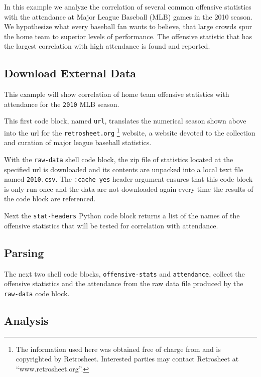 \documentclass[11pt]{article}
\begin{document}
In this example we analyze the correlation of several common offensive
statistics with the attendance at Major League Baseball (MLB) games in
the 2010 season.  We hypothesize what every baseball fan wants to
believe, that large crowds spur the home team to superior levels of
performance.  The offensive statistic that has the largest correlation
with high attendance is found and reported.
\subsection{Download External Data}
\label{sec-4_1}

This example will show correlation of home team offensive statistics
with attendance for the  \texttt{2010} MLB season.



This first code block, named \texttt{url}, translates the numerical season
shown above into the url for the \texttt{retrosheet.org} \footnote{The information used here was obtained free of charge from and
       is copyrighted by Retrosheet.  Interested parties may contact
       Retrosheet at ``www.retrosheet.org''. } website, a
website devoted to the collection and curation of major league
baseball statistics.



With the \texttt{raw-data} shell code block, the zip file of statistics located at
the specified url is downloaded and its contents are unpacked into a
local text file named \texttt{2010.csv}.  The \texttt{:cache yes} header argument
ensures that this code block is only run once and the data are not
downloaded again every time the results of the code block are referenced.



Next the \texttt{stat-headers} Python code block returns a list of the names of the
offensive statistics that will be tested for correlation with attendance.

\subsection{Parsing}
\label{sec-4_2}

The next two shell code blocks, \texttt{offensive-stats} and \texttt{attendance},
collect the offensive statistics and the attendance from the raw data
file produced by the \texttt{raw-data} code block.
\subsection{Analysis}
\label{sec-4_3}
\end{document}
